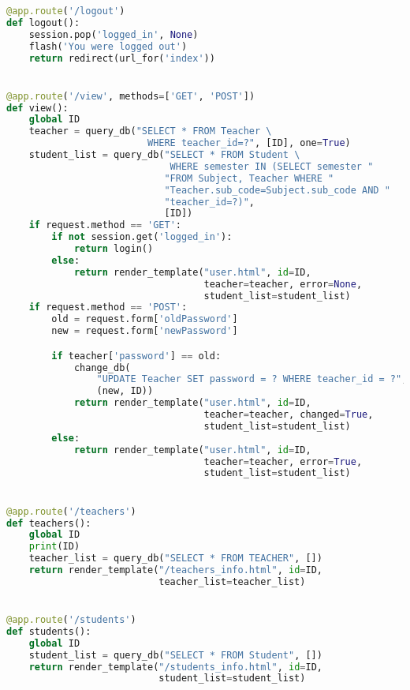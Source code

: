 \begin{lstlisting}[language=python]
@app.route('/logout')
def logout():
    session.pop('logged_in', None)
    flash('You were logged out')
    return redirect(url_for('index'))


@app.route('/view', methods=['GET', 'POST'])
def view():
    global ID
    teacher = query_db("SELECT * FROM Teacher \
                         WHERE teacher_id=?", [ID], one=True)
    student_list = query_db("SELECT * FROM Student \
                             WHERE semester IN (SELECT semester "
                            "FROM Subject, Teacher WHERE "
                            "Teacher.sub_code=Subject.sub_code AND "
                            "teacher_id=?)",
                            [ID])
    if request.method == 'GET':
        if not session.get('logged_in'):
            return login()
        else:
            return render_template("user.html", id=ID,
                                   teacher=teacher, error=None,
                                   student_list=student_list)
    if request.method == 'POST':
        old = request.form['oldPassword']
        new = request.form['newPassword']

        if teacher['password'] == old:
            change_db(
                "UPDATE Teacher SET password = ? WHERE teacher_id = ?",
                (new, ID))
            return render_template("user.html", id=ID,
                                   teacher=teacher, changed=True,
                                   student_list=student_list)
        else:
            return render_template("user.html", id=ID,
                                   teacher=teacher, error=True,
                                   student_list=student_list)


@app.route('/teachers')
def teachers():
    global ID
    print(ID)
    teacher_list = query_db("SELECT * FROM TEACHER", [])
    return render_template("/teachers_info.html", id=ID,
                           teacher_list=teacher_list)


@app.route('/students')
def students():
    global ID
    student_list = query_db("SELECT * FROM Student", [])
    return render_template("/students_info.html", id=ID,
                           student_list=student_list)



\end{lstlisting}
